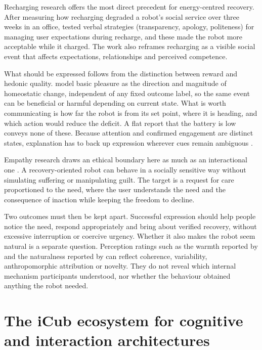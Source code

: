 Recharging research offers the most direct precedent for energy-centred recovery. After measuring how recharging degraded a robot's social service over three weeks in an office, \citet{Deshmukh2018Recharging} tested verbal strategies (transparency, apology, politeness) for managing user expectations during recharge, and these made the robot more acceptable while it charged. The work also reframes recharging as a visible social event that affects expectations, relationships and perceived competence.

What should be expressed follows from the distinction between reward and hedonic quality. \citet{LewisCanamero2016Hedonic} model basic pleasure as the direction and magnitude of homeostatic change, independent of any fixed outcome label, so the same event can be beneficial or harmful depending on current state. What is worth communicating is how far the robot is from its set point, where it is heading, and which action would reduce the deficit. A flat report that the battery is low conveys none of these. Because attention and confirmed engagement are distinct states, explanation has to back up expression wherever cues remain ambiguous \citep{AbadMoya2026Initiation,Stange2022SelfExplaining}.

Empathy research draws an ethical boundary here as much as an interactional one \citep{Park2022Empathy,Newman2025EmpathyLongTerm}. A recovery-oriented robot can behave in a socially sensitive way without simulating suffering or manipulating guilt. The target is a request for care proportioned to the need, where the user understands the need and the consequence of inaction while keeping the freedom to decline.

Two outcomes must then be kept apart. Successful expression should help people notice the need, respond appropriately and bring about verified recovery, without excessive interruption or coercive urgency. Whether it also makes the robot seem natural is a separate question. Perception ratings such as the warmth reported by \citet{Scheunemann2022IntrinsicallyMotivated} and the naturalness reported by \citet{MarotoGomez2025RobotCompanion} can reflect coherence, variability, anthropomorphic attribution or novelty. They do not reveal which internal mechanism participants understood, nor whether the behaviour obtained anything the robot needed.

\section{The iCub ecosystem for cognitive and interaction architectures}
\label{sec:icub-ecosystem}

